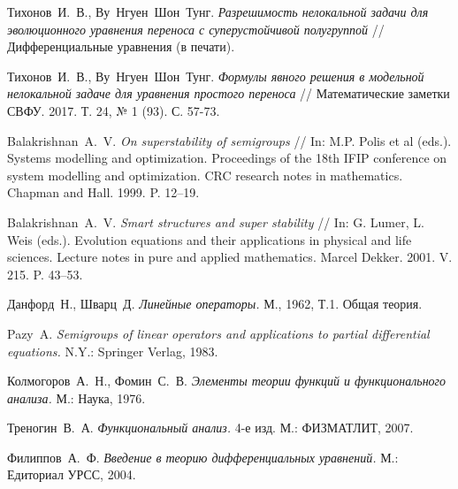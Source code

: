 \documentclass{article}
\theoremstyle{definition}
\begin{document}
\newpage

\begin{thebibliography}{99}
	

	 Тихонов~И.~В., Ву~Нгуен~Шон~Тунг.
	\emph{Разрешимость нелокальной задачи для эволюционного уравнения переноса с суперустойчивой полугруппой}
	// Дифференциальные уравнения (в печати).
	
	 Тихонов~И.~В., Ву~Нгуен~Шон~Тунг.
	\emph{Формулы явного решения в модельной нелокальной задаче для уравнения простого переноса}
	// Математические заметки СВФУ. 2017. Т. 24, № 1 (93). С. 57-73.
	
	 Balakrishnan~A.~V.
	\emph{On superstability of semigroups}
	// In: M.P. Polis et al (eds.). Systems modelling and optimization. 
	Proceedings of the 18th IFIP conference on system modelling and optimization. 
	CRC research notes in mathematics. Chapman and Hall. 1999. P. 12–19.
	
	 Balakrishnan~A.~V.
	\emph{Smart structures and super stability} 
	// In: G. Lumer, L. Weis (eds.). Evolution
	equations and their applications in physical and life sciences. Lecture notes in pure and applied
	mathematics. Marcel Dekker. 2001. V. 215. P. 43–53.
	
	 Данфорд~Н., Шварц~Д.
	\emph{Линейные операторы.} М., 1962, Т.1. Общая теория.

	 Pazy~A.
	\emph{Semigroups of linear operators and applications to partial differential equations.} N.Y.: Springer Verlag, 1983.
	
	 Колмогоров~А.~Н., Фомин~С.~В.
	\emph{Элементы теории функций и функционального анализа.} М.: Наука, 1976.
	
	 Треногин~В.~А.
	\emph{Функциональный анализ.} 4-е изд. М.: ФИЗМАТЛИТ, 2007.
	
	 Филиппов~А.~Ф.
	\emph{Введение в теорию дифференциальных уравнений.} М.: Едиториал УРСС, 2004.
\end{thebibliography}
\end{document}
